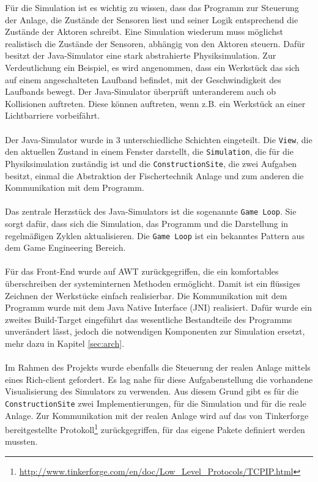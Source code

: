 \documentclass[fontsize=11pt,a4paper,final]{scrartcl}[2003/01/01]
\begin{document}
Für die Simulation ist es wichtig zu wissen, dass das Programm zur Steuerung der Anlage, die Zustände der Sensoren liest und seiner Logik entsprechend die Zustände der Aktoren schreibt. Eine Simulation wiederum muss möglichst realistisch die Zustände der Sensoren, abhängig von den Aktoren steuern. Dafür besitzt der Java-Simulator eine stark abstrahierte Physiksimulation. Zur Verdeutlichung ein Beispiel, es wird angenommen, dass ein Werkstück das sich auf einem angeschalteten Laufband befindet, mit der Geschwindigkeit des Laufbands bewegt. Der Java-Simulator überprüft unteranderem auch ob Kollisionen auftreten. Diese können auftreten, wenn z.B. ein Werkstück an einer Lichtbarriere vorbeifährt.\\
\\
Der Java-Simulator wurde in 3 unterschiedliche Schichten eingeteilt. Die \lstinline|View|, die den aktuellen Zustand in einem Fenster darstellt, die \lstinline|Simulation|, die für die Physiksimulation zuständig ist und die \lstinline|ConstructionSite|, die zwei Aufgaben besitzt, einmal die Abstraktion der Fischertechnik Anlage und zum anderen die Kommunikation mit dem Programm.\\
\\
Das zentrale Herzstück des Java-Simulators ist die sogenannte \lstinline|Game Loop|. Sie sorgt dafür, dass sich die Simulation, das Programm und die Darstellung in regelmäßigen Zyklen aktualisieren. Die \lstinline|Game Loop| ist ein bekanntes Pattern aus dem Game Engineering Bereich.\\
\\
Für das Front-End wurde auf AWT zurückgegriffen, die ein komfortables überschreiben der systeminternen Methoden ermöglicht. Damit ist ein flüssiges Zeichnen der Werkstücke einfach realisierbar. Die Kommunikation mit dem Programm wurde mit dem Java Native Interface (JNI) realisiert. Dafür wurde ein zweites Build-Target eingeführt das wesentliche Bestandteile des Programms unverändert lässt, jedoch die notwendigen Komponenten zur Simulation ersetzt, mehr dazu in Kapitel \ref{sec:arch}.\\
\\
Im Rahmen des Projekts wurde ebenfalls die Steuerung der realen Anlage mittels eines Rich-client gefordert. Es lag nahe für diese Aufgabenstellung die vorhandene Visualisierung des Simulators zu verwenden. Aus diesem Grund gibt es für die \lstinline|ConstructionSite| zwei Implementierungen, für die Simulation und für die reale Anlage. Zur Kommunikation mit der realen Anlage wird auf das von Tinkerforge bereitgestellte Protokoll\footnote{\url{http://www.tinkerforge.com/en/doc/Low_Level_Protocols/TCPIP.html}} zurückgegriffen, für das eigene Pakete definiert werden mussten.\\
\end{document}
